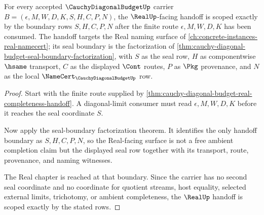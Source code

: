 \begin{theorem}
\label{thm:cauchy-diagonal-budget-real-seal-scope}
For every accepted $\CauchyDiagonalBudgetUp$ carrier $B=(\epsilon,M,W,D,K,S,H,C,P,N)$, the $\RealUp$-facing handoff is scoped exactly by the boundary rows $S,H,C,P,N$ after the finite route $\epsilon,M,W,D,K$ has been consumed. The handoff targets the Real naming surface of \autoref{ch:concrete-instances-real-namecert}; its seal boundary is the factorization of \autoref{thm:cauchy-diagonal-budget-seal-boundary-factorization}, with $S$ as the seal row, $H$ as componentwise $\hsame$ transport, $C$ as the displayed $\Cont$ routes, $P$ as $\Pkg$ provenance, and $N$ as the local $\NameCert_{\CauchyDiagonalBudgetUp}$ row.
\end{theorem}
\begin{proof}
Start with the finite route supplied by \autoref{thm:cauchy-diagonal-budget-real-completeness-handoff}. A diagonal-limit consumer must read $\epsilon,M,W,D,K$ before it reaches the seal coordinate $S$.

Now apply the seal-boundary factorization theorem. It identifies the only handoff boundary as $S,H,C,P,N$, so the Real-facing surface is not a free ambient completion claim but the displayed seal row together with its transport, route, provenance, and naming witnesses.

The Real chapter is reached at that boundary. Since the carrier has no second seal coordinate and no coordinate for quotient streams, host equality, selected external limits, trichotomy, or ambient completeness, the $\RealUp$ handoff is scoped exactly by the stated rows.
\end{proof}

